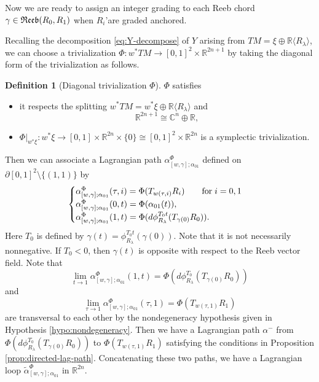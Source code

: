 \documentclass[reqno]{amsart}
\def\R{\ifmmode{\mathbb R}\else{$\mathbb R$}\fi} %
\def\C{\ifmmode{\mathbb C}\else{$\mathbb C$}\fi} %
\newcommand{\be}{\begin{equation}}
\newcommand{\ee}{\end{equation}}
\theoremstyle{theorem}
\theoremstyle{definition}
\newtheorem{defn}[thm]{Definition}
\numberwithin{equation}{section}
\def\R{{\mathbb R}}
\def\C{{\mathbb C}}
\def\R{{\mathbb R}}
\def\C{\mathbb{C}}
\def\R{\ifmmode{\mathbb R}\else{$\mathbb R$}\fi} %
\def\C{\ifmmode{\mathbb C}\else{$\mathbb C$}\fi} %
\def\R{{\mathbb R}}
\def\C{{\mathbb C}}
\def\R{{\mathbb R}}
\begin{document}
Now we are ready to assign an integer grading to each Reeb chord $\gamma \in \frak{Reeb}(R_0,R_1)$
when $R_i$'are graded anchored.

Recalling the decomposition \eqref{eq:Y-decompose} of $Y$ arising from $TM = \xi \oplus \R \langle R_\lambda \rangle$,
we can choose a trivialization $\Phi:w^*TM \rightarrow [0,1]^2\times\R^{2n+1}$
by taking the diagonal form of the trivialization as follows.

\begin{defn}[Diagonal trivialization $\Phi$]\label{defn:Phi} $\Phi$ satisfies
\begin{itemize}
\item it respects the splitting $w^*TM = w^*\xi \oplus \R\langle R_\lambda \rangle$ and
$$
\R^{2n+1} \cong \C^n \oplus \R,
$$
\item  $\Phi|_{w^*\xi}:w^*\xi \rightarrow [0,1]\times\R^{2n}\times\{0\} \cong [0,1]^2\times\R^{2n}$ is a symplectic trivialization.
\end{itemize}
\end{defn}

Then we can associate a Lagrangian path $\alpha^\Phi_{[w,\gamma];\alpha_{01}}$ defined on $\partial[0,1]^2\setminus \{(1,1)\}$ by
\be\label{eq:lag-loop-piece}
\begin{cases}
\alpha^\Phi_{[w,\gamma];\alpha_{01}}(\tau,i)  =  \Phi(T_{w(\tau,i)}R_i) \qquad {\rm for}
\; i=0,1 \nonumber \\
\alpha^\Phi_{[w,\gamma];\alpha_{01}}(0,t)  =  \Phi(\alpha_{01}(t)), \\
 \alpha^\Phi_{[w,\gamma];\alpha_{01}}(1,t)=\Phi(d\phi^{T_0t}_{R_\lambda}(T_{\gamma(0)}R_0)).
\end{cases}
\ee
Here $T_0$ is defined by $\gamma(t)=\phi^{T_0t}_{R_\lambda}(\gamma(0))$. Note that it is not necessarily nonnegative. If $T_0 < 0$, then $\gamma(t)$ is opposite with respect to the Reeb vector field. Note that
$$
\lim_{t\rightarrow 1}\alpha^\Phi_{[w,\gamma];\alpha_{01}}(1,t)=\Phi(d\phi^{T_0}_{R_\lambda}(T_{\gamma(0)}R_0))$$
and
$$
\lim_{\tau\rightarrow 1}\alpha^\Phi_{[w,\gamma];\alpha_{01}}(\tau,1)=\Phi(T_{w(\tau,1)}R_1)
$$
 are transversal to each other by the nondegeneracy hypothesis given in
 Hypothesis \ref{hypo:nondegeneracy}.
Then we have a Lagrangian path $\alpha^-$ from $\Phi(d\phi^{T_0}_{R_\lambda}(T_{\gamma(0)}R_0))$ to $\Phi(T_{w(\tau,1)}R_1)$ satisfying the conditions in Proposition \ref{prop:directed-lag-path}. Concatenating these two paths, we have a Lagrangian loop $\widetilde{\alpha}^\Phi_{[w,\gamma];\alpha_{01}}$ in $\R^{2n}$.
\end{document}
